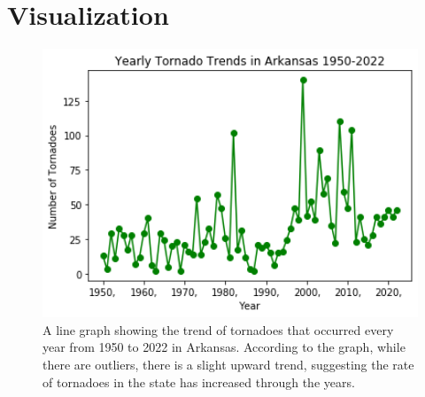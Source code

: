 
\newpage

\section{Visualization}
\begin{center}
\begin{figure}[h]
\includegraphics[width=1.0\textwidth]{graph}
\caption{A line graph showing the trend of tornadoes that occurred every year from 1950 to 2022 in Arkansas.
         According to the graph, while there are outliers, there is a slight upward trend, suggesting the rate of tornadoes in the state has increased through the years.\cite{record_tornadoes}}
\label{fig:graph}
\end{figure}
\end{center}

